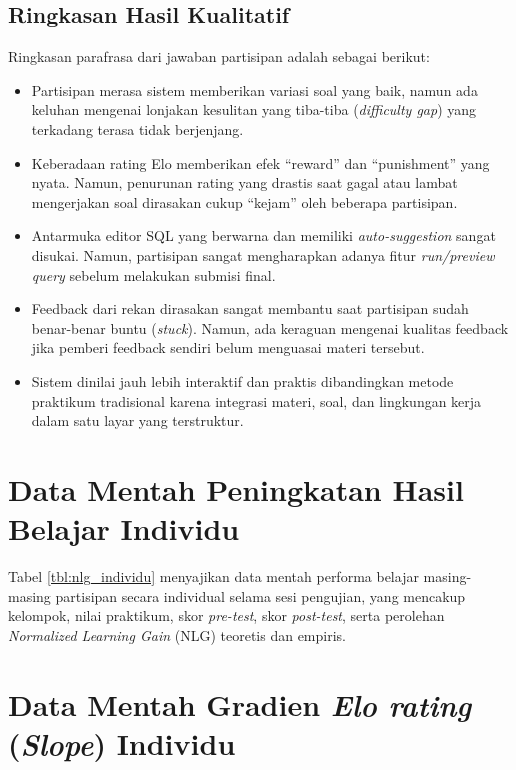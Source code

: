 \subsection{Ringkasan Hasil Kualitatif}
Ringkasan parafrasa dari jawaban partisipan adalah sebagai berikut:
\begin{itemize}
    \item Partisipan merasa sistem memberikan variasi soal yang baik, namun ada keluhan mengenai lonjakan kesulitan yang tiba-tiba (\textit{difficulty gap}) yang terkadang terasa tidak berjenjang.
    \item Keberadaan rating Elo memberikan efek ``reward'' dan ``punishment'' yang nyata. Namun, penurunan rating yang drastis saat gagal atau lambat mengerjakan soal dirasakan cukup ``kejam'' oleh beberapa partisipan.
    \item Antarmuka editor SQL yang berwarna dan memiliki \textit{auto-suggestion} sangat disukai. Namun, partisipan sangat mengharapkan adanya fitur \textit{run/preview query} sebelum melakukan submisi final.
    \item Feedback dari rekan dirasakan sangat membantu saat partisipan sudah benar-benar buntu (\textit{stuck}). Namun, ada keraguan mengenai kualitas feedback jika pemberi feedback sendiri belum menguasai materi tersebut.
    \item Sistem dinilai jauh lebih interaktif dan praktis dibandingkan metode praktikum tradisional karena integrasi materi, soal, dan lingkungan kerja dalam satu layar yang terstruktur.
\end{itemize}

\section{Data Mentah Peningkatan Hasil Belajar Individu}
\label{sec:lampiran_data_mentah}

Tabel \ref{tbl:nlg_individu} menyajikan data mentah performa belajar masing-masing partisipan secara individual selama sesi pengujian, yang mencakup kelompok, nilai praktikum, skor \textit{pre-test}, skor \textit{post-test}, serta perolehan \textit{Normalized Learning Gain} (NLG) teoretis dan empiris.



\section{Data Mentah Gradien \textit{Elo rating} (\textit{Slope}) Individu}
\label{sec:lampiran_data_slope}


